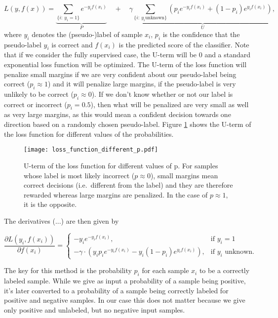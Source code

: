 \begin{equation*}
L(y,f(x)) = \underbrace{\sum_{\{i :~ y_i = 1\}} e^{-y_i f(x_i)}}_{P} \quad + \quad \gamma\underbrace{\sum_{\{i:~ y_i \text{unknown}\}} \left( p_i e^{-y_i f(x_i)} + (1-p_i) e^{y_i f(x_i)}\right)}_{U}, 
\end{equation*}
where $y_i$ denotes the (pseudo-)label of sample $x_i$, $p_i$ is the confidence that the pseudo-label $y_i$ is correct and $f(x_i)$ is the predicted score of the classifier.
Note that if we consider the fully supervised case, the U-term will be 0 and a standard exponential loss function will be optimized. 
The U-term of the loss function will penalize small margins if we are very confident about our pseudo-label being correct ($p_i \approx 1$) and it will penalize large margins, if the pseudo-label is very unlikely to be correct ($p_i \approx 0$). 
If we don't know whether or not our label is correct or incorrect ($p_i = 0.5$), then what will be penalized are very small as well as very large margins, as this would mean a confident decision towards one direction based on a randomly chosen pseudo-label. Figure \ref{fig:ourlossfunctionplot} shows the U-term of the loss function for different values of the probabilities.

\begin{figure}[ht]
  \centering
  \texttt{[image: loss\_function\_different\_p.pdf]}	
  \caption{U-term of the loss function for different values of p. For samples whose label is most likely incorrect ($p \approx 0$), small margins mean correct decisions (i.e.\ different from the label) and they are therefore rewarded whereas large margins are penalized. In the case of $p \approx 1$, it is the opposite.}
  \label{fig:ourlossfunctionplot}
\end{figure}

The derivatives (...)  are then given by 

\begin{equation*}
 \frac{\partial L(y_i,f(x_i))}{\partial f(x_i)} = 
    \begin{cases}
	-y_i e^{-y_i f(x_i)}, & \text{if $y_i = 1$}\\
	-\gamma \cdot \left(y_i p_i e^{-y_i f(x_i)} - y_i (1 - p_i) e^{y_i f(x_i)} \right), & \text{if $y_i$ unknown.}
      \end{cases}
\end{equation*}

The key for this method is the probability $p_i$ for each sample $x_i$ to be a correctly labeled sample. While we give as input a probability of a sample being positive, it's later converted to a probability of a sample being correctly labeled for positive and negative samples.  In our case this does not matter because we give only positive and unlabeled, but no negative input samples.

